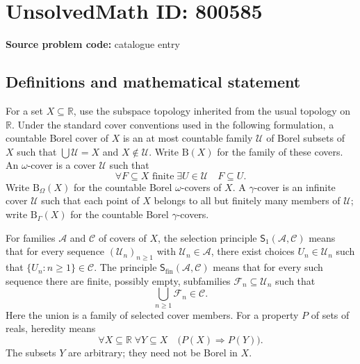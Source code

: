 \documentclass[11pt]{article}
\newcommand{\R}{\mathbb{R}}
\begin{document}
\section*{UnsolvedMath ID: 800585}
\textbf{Source problem code:} catalogue entry
\subsection{Definitions and mathematical statement}
For a set \(X\subseteq\R\), use the subspace topology inherited from the usual topology on \(\R\). Under the standard cover conventions used in the following formulation, a countable Borel cover of \(X\) is an at most countable family \(\mathcal U\) of Borel subsets of \(X\) such that \(\bigcup\mathcal U=X\) and \(X\notin\mathcal U\). Write \(\mathrm B(X)\) for the family of these covers. An \(\omega\)-cover is a cover \(\mathcal U\) such that
\[
  \forall F\subseteq X\text{ finite}\;\exists U\in\mathcal U\quad F\subseteq U.
\]
Write \(\mathrm B_\Omega(X)\) for the countable Borel \(\omega\)-covers of \(X\). A \(\gamma\)-cover is an infinite cover \(\mathcal U\) such that each point of \(X\) belongs to all but finitely many members of \(\mathcal U\); write \(\mathrm B_\Gamma(X)\) for the countable Borel \(\gamma\)-covers.

For families \(\mathcal A\) and \(\mathcal C\) of covers of \(X\), the selection principle \(\mathsf S_1(\mathcal A,\mathcal C)\) means that for every sequence \((\mathcal U_n)_{n\geq1}\) with \(\mathcal U_n\in\mathcal A\), there exist choices \(U_n\in\mathcal U_n\) such that \(\{U_n:n\geq1\}\in\mathcal C\). The principle \(\mathsf S_{\mathrm{fin}}(\mathcal A,\mathcal C)\) means that for every such sequence there are finite, possibly empty, subfamilies \(\mathcal F_n\subseteq\mathcal U_n\) such that
\[
  \bigcup_{n\geq1}\mathcal F_n\in\mathcal C.
\]
Here the union is a family of selected cover members. For a property \(P\) of sets of reals, heredity means
\[
  \forall X\subseteq\R\;\forall Y\subseteq X\quad
  \bigl(P(X)\Longrightarrow P(Y)\bigr).
\]
The subsets \(Y\) are arbitrary; they need not be Borel in \(X\).
\end{document}
